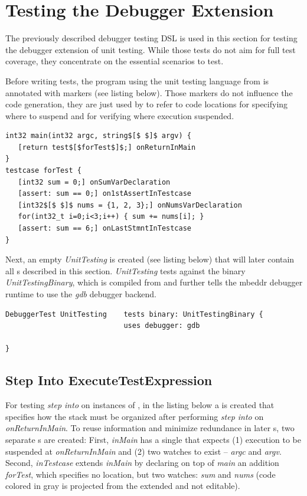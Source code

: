 \section{Testing the Debugger Extension}

The previously described debugger testing \ac{DSL} is used in this section for
testing the debugger extension of unit testing. While those
tests do not aim for full test coverage, they concentrate on the essential
scenarios to test.

Before writing tests, the program using the unit testing
language from  is annotated with markers
(see listing below). Those markers do not influence the code generation, they
are just used by  to refer to code locations for
specifying where to suspend and for verifying where
execution suspended.

\begin{lstlisting}[language=markerDSL]
int32 main(int32 argc, string$[$ $]$ argv) {
   [return test$[$forTest$]$;] onReturnInMain
}
testcase forTest {
   [int32 sum = 0;] onSumVarDeclaration
   [assert: sum == 0;] on1stAssertInTestcase
   [int32$[$ $]$ nums = {1, 2, 3};] onNumsVarDeclaration
   for(int32_t i=0;i<3;i++) { sum += nums[i]; }
   [assert: sum == 6;] onLastStmntInTestcase
}
\end{lstlisting}	

Next, an empty  \emph{UnitTesting} is created (see listing
below) that will later contain all s described in this
section. \emph{UnitTesting} tests against the binary
\emph{UnitTestingBinary}, which is compiled from  and further tells the
mbeddr debugger runtime to use the \emph{gdb} debugger backend.

\begin{lstlisting}[language=testingDSL]
DebuggerTest UnitTesting    tests binary: UnitTestingBinary {
                            uses debugger: gdb

}  
\end{lstlisting}

\subsection{Step Into ExecuteTestExpression}

For testing \emph{step into} on instances of ,
in the listing below a  is created that specifies how
the stack must be organized after performing \emph{step
into} on \emph{onReturnInMain}. To reuse information and 
minimize redundance in later
s, two separate 
s are created: First, \emph{inMain} 
has a single  that expects (1) execution to be suspended at  
\emph{onReturnInMain} and (2) two watches to exist -- \emph{argc} and
\emph{argv}. Second, \emph{inTestcase} extends
\emph{inMain} by declaring on top of \emph{main} an addition
 \emph{forTest}, which specifies no location, but two
watches: \emph{sum} and \emph{nums} (code colored
in gray is projected from the extended  and not
editable).

